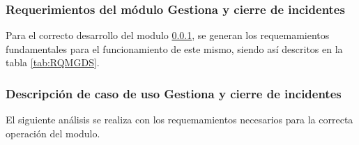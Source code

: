 \subsubsection{Requerimientos del módulo Gestiona y cierre de incidentes}\label{Mod:RQMGI}


Para el correcto desarrollo del modulo \ref{Mod:RQMGI}, se generan los requemamientos fundamentales para el funcionamiento de este mismo, siendo así descritos en la tabla \ref{tab:RQMGDS}.


\begin{table}[H]
	\centering
	\caption{Requerimientos funciones del modulo- Gestión de incidentes}
%
\end{table}%
\textbf{}





\subsubsection{Descripción de caso de uso Gestiona y cierre de incidentes}



El siguiente análisis se realiza con los requemamientos necesarios para la correcta operación del modulo.

